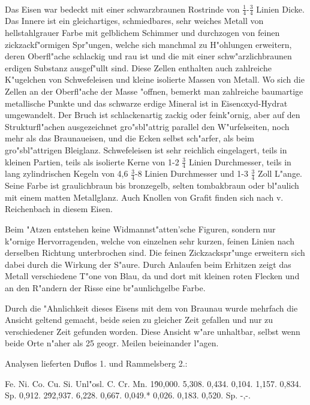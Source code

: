 \documentclass[a4paper, 11pt, oneside]{article}
\begin{document}
\paragraph{}
Das Eisen war bedeckt mit einer schwarzbraunen Rostrinde von $\frac{1}{4}$-$\frac{3}{4}$ Linien Dicke. Das Innere ist ein gleichartiges, schmiedbares, sehr weiches Metall von hellstahlgrauer Farbe mit gelblichem Schimmer und durchzogen von feinen zickzackf"ormigen Spr"ungen, welche sich manchmal zu H"ohlungen erweitern, deren Oberfl"ache schlackig und rau ist und die mit einer schw"arzlichbraunen erdigen Substanz ausgef"ullt sind. Diese Zellen enthalten auch zahlreiche K"ugelchen von Schwefeleisen und kleine isolierte Massen von Metall. Wo sich die Zellen an der Oberfl"ache der Masse "offnen, bemerkt man zahlreiche baumartige metallische Punkte und das schwarze erdige Mineral ist in Eisenoxyd-Hydrat umgewandelt. Der Bruch ist schlackenartig zackig oder feink"ornig, aber auf den Strukturfl"achen ausgezeichnet gro"sbl"attrig parallel den W"urfelseiten, noch mehr als das Braunaueisen, und die Ecken selbst sch"arfer, als beim gro"sbl"attrigen Bleiglanz. Schwefeleisen ist sehr reichlich eingelagert, teils in kleinen Partien, teils als isolierte Kerne von 1-2 $\frac{3}{4}$ Linien Durchmesser, teils in lang zylindrischen Kegeln von 4,6 $\frac{3}{4}$-8 Linien Durchmesser und 1-3 $\frac{3}{4}$ Zoll L"ange. Seine Farbe ist graulichbraun bis bronzegelb, selten tombakbraun oder bl"aulich mit einem matten Metallglanz. Auch Knollen von Grafit finden sich nach v. Reichenbach in diesem Eisen.

Beim "Atzen entstehen keine Widmannst"atten'sche Figuren, sondern nur k"ornige Hervorragenden, welche von einzelnen sehr kurzen, feinen Linien nach derselben Richtung unterbrochen sind. Die feinen Zickzackspr"unge erweitern sich dabei durch die Wirkung der S"aure. Durch Anlaufen beim Erhitzen zeigt das Metall verschiedene T"one von Blau, da und dort mit kleinen roten Flecken und an den R"andern der Risse eine br"aunlichgelbe Farbe.

Durch die "Ahnlichkeit dieses Eisens mit dem von Braunau wurde mehrfach die Ansicht geltend gemacht, beide seien zu gleicher Zeit gefallen und nur zu verschiedener Zeit gefunden worden. Diese Ansicht w"are unhaltbar, selbst wenn beide Orte n"aher als 25 geogr. Meilen beieinander l"agen.

Analysen lieferten Duflos 1. und Rammelsberg 2.:

Fe. Ni. Co. Cu. Si. Unl"osl. C. Cr. Mn.  
1\. 90,000. 5,308. 0,434. 0,104. 1,157. 0,834. Sp. 0,912.  
2\. 92,937. 6,228. 0,667. 0,049.* 0,026. 0,183. 0,520. Sp. -,-.
\end{document}
